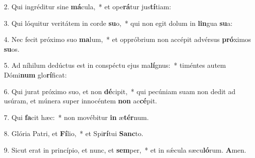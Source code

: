 2. Qui ingréditur sine \textbf{má}cula,~*  et ope\textbf{rá}tur jus\textbf{tí}tiam:\

3. Qui lóquitur veritátem in corde \textbf{su}o,~*  qui non egit dolum in \textbf{lin}gua \textbf{su}a:\

4. Nec fecit próximo suo \textbf{ma}lum,~*  et oppróbrium non accépit advérsus \textbf{pró}ximos \textbf{su}os.\

5. Ad níhilum dedúctus est in conspéctu ejus ma\textbf{lí}gnus:~*  timéntes autem Dómi\textbf{num} glo\textbf{rí}ficat:\

6. Qui jurat próximo suo, et non \textbf{dé}cipit,~*  qui pecúniam suam non dedit ad usúram, et múnera super innocéntem \textbf{non} ac\textbf{cé}pit.\

7. Qui \textbf{fa}cit hæc:~*  non movébitur \textbf{in} æ\textbf{tér}num.\

8. Glória Patri, et \textbf{Fí}lio,~*  et Spi\textbf{rí}tui \textbf{Sanc}to.\

9. Sicut erat in princípio, et nunc, et \textbf{sem}per,~*  et in sǽcula sæcu\textbf{ló}rum. \textbf{A}men.\

